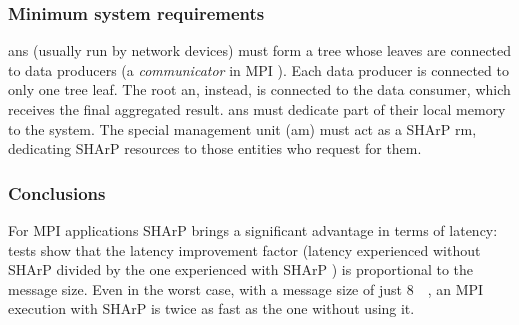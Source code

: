 \subsubsection{Minimum system requirements}
\glspl{an} (usually run by network devices) must form a tree whose leaves are connected to data producers (a \textit{communicator} in MPI \cite{mpi}).
Each data producer is connected to only one tree leaf.
The root \gls{an}, instead, is connected to the data consumer, which receives the final aggregated result.
\glspl{an} must dedicate part of their local memory to the system.
The special management unit (\gls{am}) must act as a SHArP \cite{sharp} \gls{rm}, dedicating SHArP \cite{sharp} resources to those entities who request for them.

\subsubsection{Conclusions}
For MPI \cite{mpi} applications SHArP \cite{sharp} brings a significant advantage in terms of latency: tests show that the latency improvement factor (latency experienced without SHArP \cite{sharp} divided by the one experienced with SHArP \cite{sharp}) is proportional to the message size.
Even in the worst case, with a message size of just \SI{8}{\mega\byte}, an MPI \cite{mpi} execution with SHArP \cite{sharp} is twice as fast as the one without using it.